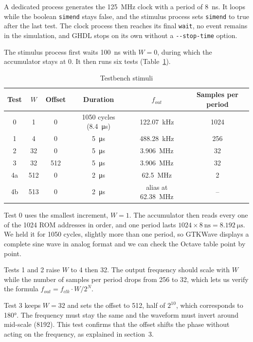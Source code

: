 \documentclass[11pt,a4paper]{article}
\renewcommand{\_}{\oldunderscore\allowbreak}
\begin{document}
A dedicated process generates the \SI{125}{\mega\hertz} clock with a period of
\SI{8}{\nano\second}. It loops while the boolean \texttt{sim\_end} stays false, and
the stimulus process sets \texttt{sim\_end} to true after the last test. The clock
process then reaches its final \texttt{wait}, no event remains in the simulation,
and GHDL stops on its own without a \texttt{-{}-stop-time} option.

The stimulus process first waits \SI{100}{\nano\second} with $W = 0$, during which
the accumulator stays at 0. It then runs six tests (Table~\ref{tab:tb}).

\begin{table}[H]
\centering
\begin{tabular}{cccccc}
\toprule
Test & $W$ & Offset & Duration & $f_{out}$ & Samples per period \\
\midrule
0  & 1   & 0   & 1050 cycles (\SI{8.4}{\micro\second}) & \SI{122.07}{\kilo\hertz} & 1024 \\
1  & 4   & 0   & \SI{5}{\micro\second} & \SI{488.28}{\kilo\hertz} & 256 \\
2  & 32  & 0   & \SI{5}{\micro\second} & \SI{3.906}{\mega\hertz}  & 32 \\
3  & 32  & 512 & \SI{5}{\micro\second} & \SI{3.906}{\mega\hertz}  & 32 \\
4a & 512 & 0   & \SI{2}{\micro\second} & \SI{62.5}{\mega\hertz}   & 2 \\
4b & 513 & 0   & \SI{2}{\micro\second} & alias at \SI{62.38}{\mega\hertz} & -- \\
\bottomrule
\end{tabular}
\caption{Testbench stimuli}\label{tab:tb}
\end{table}

Test 0 uses the smallest increment, $W = 1$. The accumulator then reads every one
of the 1024 ROM addresses in order, and one period lasts
$1024 \times \SI{8}{\nano\second} = \SI{8.192}{\micro\second}$. We held it for 1050
cycles, slightly more than one period, so GTKWave displays a complete sine wave in
analog format and we can check the Octave table point by point.

Tests 1 and 2 raise $W$ to 4 then 32. The output frequency should scale with $W$
while the number of samples per period drops from 256 to 32, which lets us verify
the formula $f_{out} = f_{clk} \cdot W / 2^N$.

Test 3 keeps $W = 32$ and sets the offset to 512, half of $2^{10}$, which
corresponds to \ang{180}. The frequency must stay the same and the waveform must
invert around mid-scale (8192). This test confirms that the offset shifts the phase
without acting on the frequency, as explained in section~3.
\end{document}
